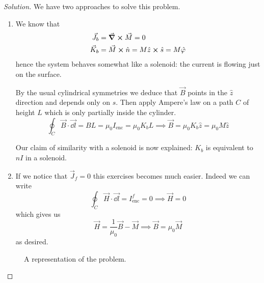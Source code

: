 \documentclass[12pt]{extarticle}
\begin{document}
\begin{proof}[Solution]
	We have two approaches to solve this problem.
	\begin{enumerate}
		\item We know that
		      \begin{align}
			      \vec J_b & = \curl \vec M = 0                                               \\
			      \vec K_b & = \vec M \cross \hat n = M \hat z \cross \hat s = M \hat \varphi
		      \end{align}
		      hence the system behaves somewhat like a solenoid:
		      the current is flowing just on the surface.

		      By the usual cylindrical symmetries we deduce that $\vec B$ points in the $\hat z$ direction
		      and depends only on $s$.
		      Then apply Ampere's law on a path $C$ of height $L$ which is only partially inside the cylinder.
		      \begin{equation}
			      \oint_C \vec B \cdot \vec{\dd l} = B L = \mu_0 I_\text{enc} = \mu_0 K_b L
			      \implies \vec B = \mu_0 K_b \hat z = \mu_0 M \hat z
		      \end{equation}

		      Our claim of similarity with a solenoid is now explained: $K_b$ is equivalent to $nI$ in a solenoid.

		\item If we notice that $\vec J_f = 0$ this exercises becomes much easier.
		      Indeed we can write
		      \begin{equation}
			      \oint_C \vec H \cdot \vec{\dd l} = I_\text{enc}^f = 0
			      \implies \vec H = 0
		      \end{equation}
		      which gives us
		      \begin{equation}
			      \vec H = \frac{1}{\mu_0} \vec B - \vec M \implies \vec B = \mu_0 \vec M
		      \end{equation}
		      as desired.
	\end{enumerate}

	\begin{figure}[H]
		\centering
		
		\caption{A representation of the problem.}
	\end{figure}
\end{proof}
\end{document}
